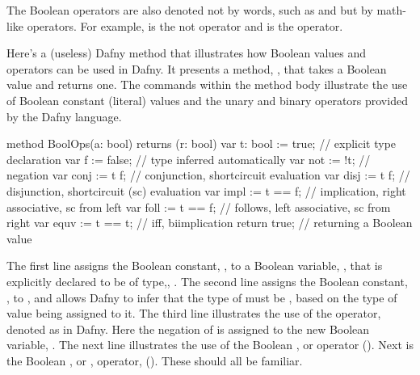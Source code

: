 \documentclass[letterpaper,10pt,english]{sphinxmanual}
\begin{document}
The Boolean operators are also denoted not by words, such as  and
 but by math-like operators. For example, \sphinxstyleemphasis{!} is the not operator
and \sphinxstyleemphasis{\textbar{}\textbar{}} is the  operator.

Here’s a (useless) Dafny method that illustrates how Boolean values
and operators can be used in Dafny. It presents a method, ,
that takes a Boolean value and returns one. The commands within the
method body illustrate the use of Boolean constant (literal) values
and the unary and binary operators provided by the Dafny language.

\begin{sphinxVerbatim}[commandchars=\\\{\}]
method BoolOps(a: bool) returns (r: bool)
\PYGZob{}
    var t: bool := true;    // explicit type declaration
    var f := false;         // type inferred automatically
    var not := !t;          // negation
    var conj := t \PYGZam{}\PYGZam{} f;     // conjunction, short\PYGZhy{}circuit evaluation
    var disj := t \textbar{}\textbar{} f;     // disjunction, short\PYGZhy{}circuit (sc) evaluation
    var impl := t ==\PYGZgt{} f;    // implication, right associative, sc from left
    var foll := t \PYGZlt{}== f;    // follows, left associative, sc from right
    var equv := t \PYGZlt{}==\PYGZgt{} t;   // iff, bi\PYGZhy{}implication
    return true;            // returning a Boolean value
 \PYGZcb{}
\end{sphinxVerbatim}

The first line assigns the Boolean constant, , to a Boolean
variable, , that is explicitly declared to be of type,, .
The second line assigns the Boolean constant, , to , and
allows Dafny to infer that the type of  must be , based on
the type of value being assigned to it. The third line illustrates the
use of the  operator, denoted as \sphinxstyleemphasis{!} in Dafny. Here the
negation of  is assigned to the new Boolean variable, . The
next line illustrates the use of the Boolean , or 
operator (\sphinxstyleemphasis{\&\&}). Next is the Boolean , or , operator,
(\sphinxstyleemphasis{\textbar{}\textbar{}}). These should all be familiar.
\end{document}
